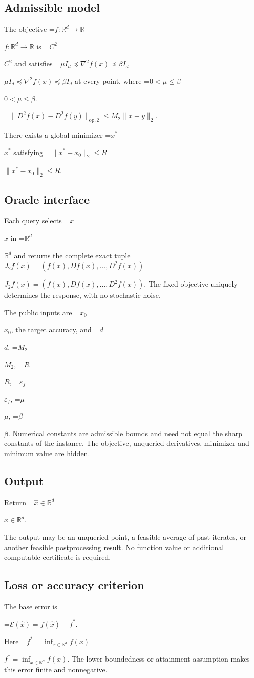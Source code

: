 \documentclass[10pt,a4paper]{article}
\newcommand{\AtlasMath}[1]{\par\begingroup\centering\setbox0=\hbox{$\displaystyle #1$}\ifdim\wd0>1.4\linewidth\typeout{ATLAS WIDE FORMULA: \the\wd0}\fi\ifdim\wd0>\linewidth\resizebox{\linewidth}{!}{\box0}\else\box0\fi\par\endgroup}
\newcommand{\AtlasInlineMath}[1]{\begingroup\setbox0=\hbox{$#1$}\ifdim\wd0>.4\linewidth\endgroup\AtlasMath{#1}\else\endgroup$#1$\fi}
\begin{document}
\subsection{Admissible model}
The objective \AtlasInlineMath{f:\mathbb{R}^d\to\mathbb{R}} is \AtlasInlineMath{C^2} and satisfies \AtlasInlineMath{\mu I_d\preceq\nabla^2f(x)\preceq\beta I_d} at every point, where \AtlasInlineMath{0<\mu\le\beta}.


\AtlasMath{\|D^{2}f(x)-D^{2}f(y)\|_{\mathrm{op},2}\le M_2\|x-y\|_{2}.}


There exists a global minimizer \AtlasInlineMath{x^*} satisfying \AtlasInlineMath{\|x^*-x_0\|_2\le R}.

\subsection{Oracle interface}
Each query selects \AtlasInlineMath{x} in \AtlasInlineMath{\mathbb{R}^d} and returns the complete exact tuple \AtlasInlineMath{J_{2}f(x)=(f(x),Df(x),\ldots,D^{2}f(x))}. The fixed objective uniquely determines the response, with no stochastic noise.

The public inputs are \AtlasInlineMath{x_0}, the target accuracy, and \AtlasInlineMath{d}, \AtlasInlineMath{M_2}, \AtlasInlineMath{R}, \AtlasInlineMath{\varepsilon_f}, \AtlasInlineMath{\mu}, \AtlasInlineMath{\beta}. Numerical constants are admissible bounds and need not equal the sharp constants of the instance. The objective, unqueried derivatives, minimizer and minimum value are hidden.

\subsection{Output}
Return \AtlasInlineMath{\widehat{x}\in \mathbb{R}^d}.

The output may be an unqueried point, a feasible average of past iterates, or another feasible postprocessing result. No function value or additional computable certificate is required.

\subsection{Loss or accuracy criterion}
The base error is


\AtlasMath{\mathcal{E}(\widehat{x})=f(\widehat{x})-f^*.}


Here \AtlasInlineMath{f^*=\inf_{x\in \mathbb{R}^d}f(x)}. The lower-boundedness or attainment assumption makes this error finite and nonnegative.
\end{document}
